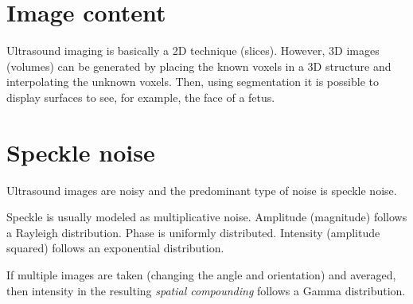 \section{Image content}
Ultrasound imaging is basically a 2D technique (slices). However, 3D
images (volumes) can be generated by placing the known voxels in a 3D
structure and interpolating the unknown voxels. Then, using
segmentation it is possible to display surfaces to see, for example,
the face of a fetus.

\section{Speckle noise}
Ultrasound images are noisy and the predominant type of noise is
speckle noise.

Speckle is usually modeled as multiplicative noise. Amplitude
(magnitude) follows a Rayleigh distribution. Phase is uniformly
distributed. Intensity (amplitude squared) follows an exponential
distribution.

If multiple images are taken (changing the angle and orientation) and
averaged, then intensity in the resulting \emph{spatial compounding}
\cite{bushberg2011essential} follows a Gamma distribution.
